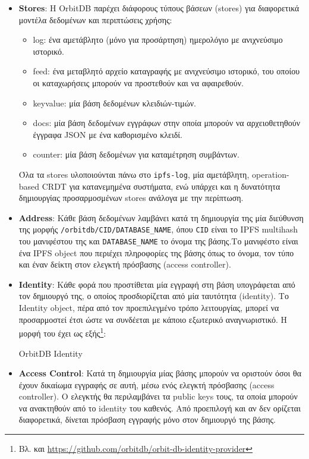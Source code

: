 \begin{itemize}
	\item \textbf{Stores}: Η OrbitDB παρέχει διάφορους τύπους βάσεων (stores) για διαφορετικά μοντέλα δεδομένων και περιπτώσεις χρήσης:
	
	\begin{itemize}
		\item log: ένα αμετάβλητο (μόνο για προσάρτηση) ημερολόγιο με ανιχνεύσιμο ιστορικό.
		\item feed: ένα μεταβλητό αρχείο καταγραφής με ανιχνεύσιμο ιστορικό, του οποίου οι καταχωρήσεις μπορούν να προστεθούν και να αφαιρεθούν.
		\item keyvalue: μία βάση δεδομένων κλειδιών-τιμών.
		\item docs: μία βάση δεδομένων εγγράφων στην οποία μπορούν να αρχειοθετηθούν έγγραφα JSON με ένα καθορισμένο κλειδί.
		\item counter: μία βάση δεδομένων για καταμέτρηση συμβάντων.
	\end{itemize}
	
	Όλα τα stores υλοποιούνται πάνω στο \texttt{ipfs-log}, μία αμετάβλητη, operation-based CRDT για κατανεμημένα συστήματα, ενώ υπάρχει και η δυνατότητα δημιουργίας προσαρμοσμένων stores ανάλογα με την περίπτωση.
	
	\item \textbf{Address}: Κάθε βάση δεδομένων λαμβάνει κατά τη δημιουργία της μία διεύθυνση της μορφής \texttt{/orbitdb/CID/DATABASE\_NAME}, όπου \texttt{CID} είναι το IPFS multihash του μανιφέστου της και \texttt{DATABASE\_NAME} το όνομα της βάσης.\cite{4.3-orbitdb-guide}Το μανιφέστο είναι ένα IPFS object που περιέχει πληροφορίες της βάσης όπως το όνομα, τον τύπο και έναν δείκτη στον ελεγκτή πρόσβασης (access controller).
	
	\item \textbf{Identity}: Κάθε φορά που προστίθεται μία εγγραφή στη βάση υπογράφεται από τον δημιουργό της, ο οποίος προσδιορίζεται από μία ταυτότητα (identity). Το Identity object, πέρα από τον προεπιλεγμένο τρόπο λειτουργίας, μπορεί να προσαρμοστεί έτσι ώστε να συνδέεται με κάποιο εξωτερικό αναγνωριστικό.
	Η μορφή του έχει ως εξής\footnote{Βλ. και \url{https://github.com/orbitdb/orbit-db-identity-provider}}:
	
	\begin{enumitemcenteredfigure}
		\caption{OrbitDB Identity}
	\end{enumitemcenteredfigure}

	\item \textbf{Access Control}: Κατά τη δημιουργία μίας βάσης μπορούν να οριστούν όσοι θα έχουν δικαίωμα εγγραφής σε αυτή, μέσω ενός ελεγκτή πρόσβασης (access controller). Ο ελεγκτής θα περιλαμβάνει τα public keys τους, τα οποία μπορούν να ανακτηθούν από το identity του καθενός. Από προεπιλογή και αν δεν ορίζεται διαφορετικά, δίνεται πρόσβαση εγγραφής μόνο στον δημιουργό της βάσης.
\end{itemize}

